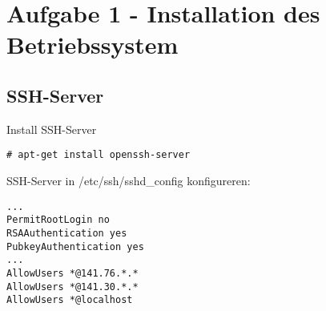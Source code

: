 \chapter{Aufgabe 1 - Installation des Betriebssystem}
\section{SSH-Server}

Install SSH-Server
\begin{lstlisting}[style=Bash]
# apt-get install openssh-server 
\end{lstlisting}

SSH-Server in /etc/ssh/sshd\_config konfigureren:
\begin{lstlisting}[style=Bash]
...
PermitRootLogin no
RSAAuthentication yes
PubkeyAuthentication yes
...
AllowUsers *@141.76.*.*
AllowUsers *@141.30.*.*
AllowUsers *@localhost
\end{lstlisting}
